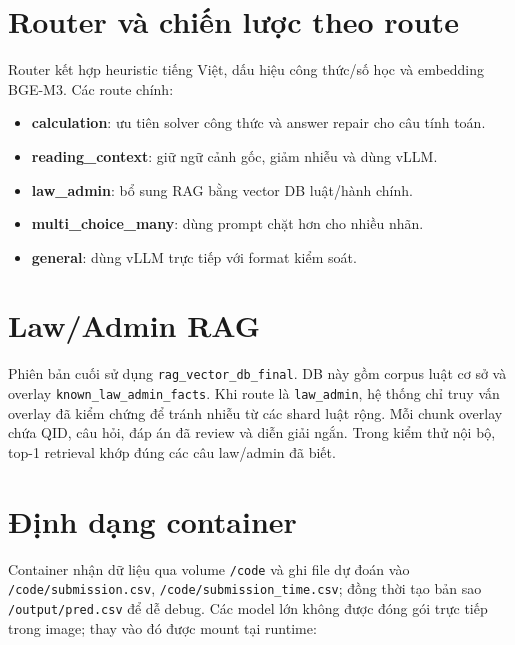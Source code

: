 \documentclass[12pt,a4paper]{article}
\begin{document}
\section{Router và chiến lược theo route}

Router kết hợp heuristic tiếng Việt, dấu hiệu công thức/số học và embedding
BGE-M3. Các route chính:

\begin{itemize}[leftmargin=*]
  \item \textbf{calculation}: ưu tiên solver công thức và answer repair cho câu
  tính toán.
  \item \textbf{reading\_context}: giữ ngữ cảnh gốc, giảm nhiễu và dùng vLLM.
  \item \textbf{law\_admin}: bổ sung RAG bằng vector DB luật/hành chính.
  \item \textbf{multi\_choice\_many}: dùng prompt chặt hơn cho nhiều nhãn.
  \item \textbf{general}: dùng vLLM trực tiếp với format kiểm soát.
\end{itemize}

\section{Law/Admin RAG}

Phiên bản cuối sử dụng \texttt{rag\_vector\_db\_final}. DB này gồm corpus luật
cơ sở và overlay \texttt{known\_law\_admin\_facts}. Khi route là
\texttt{law\_admin}, hệ thống chỉ truy vấn overlay đã kiểm chứng để tránh nhiễu
từ các shard luật rộng. Mỗi chunk overlay chứa QID, câu hỏi, đáp án đã review và
diễn giải ngắn. Trong kiểm thử nội bộ, top-1 retrieval khớp đúng các câu
law/admin đã biết.

\section{Định dạng container}

Container nhận dữ liệu qua volume \texttt{/code} và ghi file dự đoán vào
\texttt{/code/submission.csv}, \texttt{/code/submission\_time.csv}; đồng thời tạo
bản sao \texttt{/output/pred.csv} để dễ debug. Các model lớn không được đóng gói trực tiếp trong
image; thay vào đó được mount tại runtime:
\end{document}

